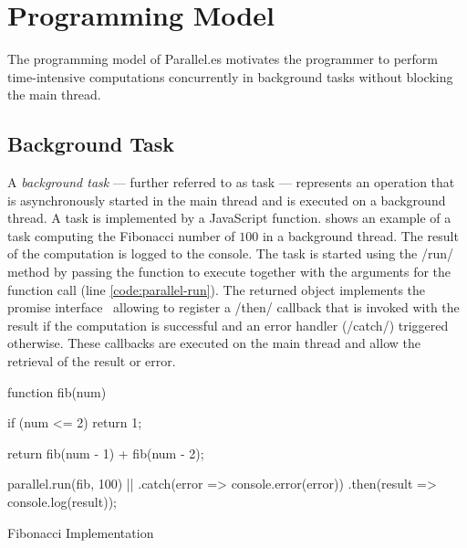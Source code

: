\section{Programming Model}\label{sec:programming-model}
The programming model of Parallel.es motivates the programmer to perform time-intensive computations concurrently in background tasks without blocking the main thread. 

\subsection{Background Task}
A \textit{background task} --- further referred to as task --- represents an operation that is asynchronously started in the main thread and is executed on a background thread. A task is implemented by a JavaScript function.  shows an example of a task computing the Fibonacci number of $100$ in a background thread. The result of the computation is logged to the console. The task is started using the \javascriptinline/run/ method by passing the function to execute together with the arguments for the function call (line \ref{code:parallel-run}). The returned object implements the promise interface~\cite[Section 18.3.18]{ecmaScript2015} allowing to register a \javascriptinline/then/ callback that is invoked with the result if the computation is successful and an error handler (\javascriptinline/catch/) triggered otherwise. These callbacks are executed on the main thread and allow the retrieval of the result or error. 


\begin{listing}
	\begin{javascriptcode}
function fib(num) {
	if (num <= 2) {
    	return 1;
	}

	return fib(num - 1) + fib(num - 2);
}
        
parallel.run(fib, 100) |$\label{code:parallel-run}$|
	.catch(error => console.error(error))
	.then(result => console.log(result));	
	\end{javascriptcode}

	\caption{Fibonacci Implementation}
	\label{fig:fibonacci-implementation}
\end{listing}

